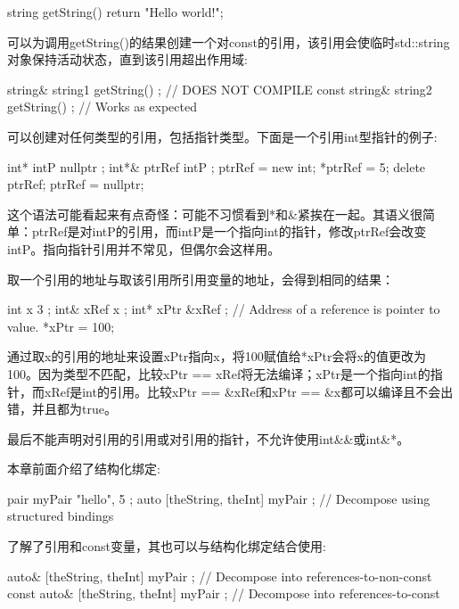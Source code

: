 \begin{cpp}
string getString() { return "Hello world!"; }
\end{cpp}

可以为调用getString()的结果创建一个对const的引用，该引用会使临时std::string对象保持活动状态，直到该引用超出作用域:

\begin{cpp}
string& string1 { getString() }; // DOES NOT COMPILE
const string& string2 { getString() }; // Works as expected
\end{cpp}


可以创建对任何类型的引用，包括指针类型。下面是一个引用int型指针的例子:

\begin{cpp}
int* intP { nullptr };
int*& ptrRef { intP };
ptrRef = new int;
*ptrRef = 5;
delete ptrRef; ptrRef = nullptr;
\end{cpp}

这个语法可能看起来有点奇怪：可能不习惯看到*和\&紧挨在一起。其语义很简单：ptrRef是对intP的引用，而intP是一个指向int的指针，修改ptrRef会改变intP。指向指针引用并不常见，但偶尔会这样用。

取一个引用的地址与取该引用所引用变量的地址，会得到相同的结果：

\begin{cpp}
int x { 3 };
int& xRef { x };
int* xPtr { &xRef }; // Address of a reference is pointer to value.
*xPtr = 100;
\end{cpp}

通过取x的引用的地址来设置xPtr指向x，将100赋值给*xPtr会将x的值更改为100。因为类型不匹配，比较xPtr == xRef将无法编译；xPtr是一个指向int的指针，而xRef是int的引用。比较xPtr == \&xRef和xPtr == \&x都可以编译且不会出错，并且都为true。

最后不能声明对引用的引用或对引用的指针，不允许使用int\&\&或int\&*。


本章前面介绍了结构化绑定:

\begin{cpp}
pair myPair { "hello", 5 };
auto [theString, theInt] { myPair }; // Decompose using structured bindings
\end{cpp}

了解了引用和const变量，其也可以与结构化绑定结合使用:

\begin{cpp}
auto& [theString, theInt] { myPair }; // Decompose into references-to-non-const
const auto& [theString, theInt] { myPair }; // Decompose into references-to-const
\end{cpp}

